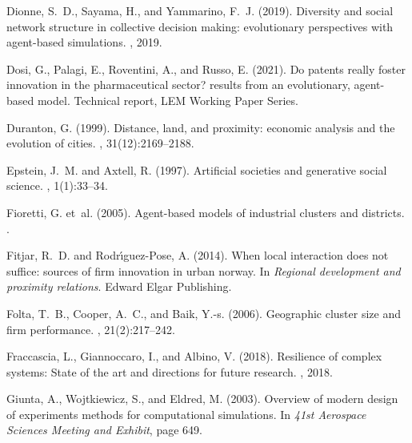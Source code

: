 \documentclass[letterpaper]{article}
\begin{document}
\begin{thebibliography}{}
Dionne, S.~D., Sayama, H., and Yammarino, F.~J. (2019).
\newblock Diversity and social network structure in collective decision making:
  evolutionary perspectives with agent-based simulations.
, 2019.

Dosi, G., Palagi, E., Roventini, A., and Russo, E. (2021).
\newblock Do patents really foster innovation in the pharmaceutical sector?
  results from an evolutionary, agent-based model.
\newblock Technical report, LEM Working Paper Series.

Duranton, G. (1999).
\newblock Distance, land, and proximity: economic analysis and the evolution of
  cities.
, 31(12):2169--2188.

Epstein, J.~M. and Axtell, R. (1997).
\newblock Artificial societies and generative social science.
, 1(1):33--34.

Fioretti, G. et~al. (2005).
\newblock Agent-based models of industrial clusters and districts.
.

Fitjar, R.~D. and Rodr{\'\i}guez-Pose, A. (2014).
\newblock When local interaction does not suffice: sources of firm innovation
  in urban norway.
\newblock In {\em Regional development and proximity relations}. Edward Elgar
  Publishing.

Folta, T.~B., Cooper, A.~C., and Baik, Y.-s. (2006).
\newblock Geographic cluster size and firm performance.
, 21(2):217--242.

Fraccascia, L., Giannoccaro, I., and Albino, V. (2018).
\newblock Resilience of complex systems: State of the art and directions for
  future research.
, 2018.

Giunta, A., Wojtkiewicz, S., and Eldred, M. (2003).
\newblock Overview of modern design of experiments methods for computational
  simulations.
\newblock In {\em 41st Aerospace Sciences Meeting and Exhibit}, page 649.


\end{thebibliography}
\end{document}
